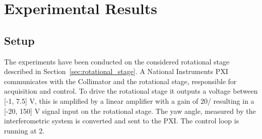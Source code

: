 \newpage
\section{Experimental Results}
\subsection{Setup}
The experiments have been conducted on the considered rotational stage described in Section~\ref{sec:rotational_stage}. A National Instruments PXI communicates with the Collimator and the rotational stage, responsible for acquisition and control. To drive the rotational stage it outputs a voltage between [-1, 7.5] V, this is amplified by a linear amplifier with a gain of \unit{20}{\volt/\volt} resulting in a [-20, 150] V signal input on the rotational stage. The yaw angle, measured by the interferometric system is converted and sent to the PXI. The control loop is running at \unit{2}{\kilo\hertz}.
